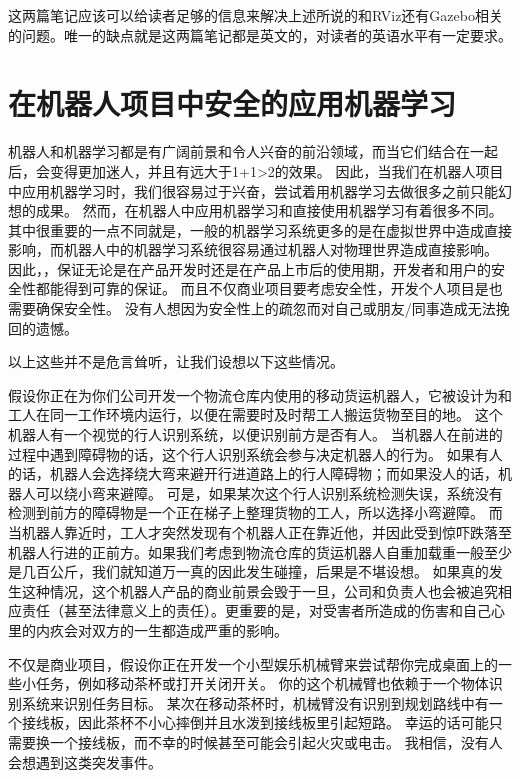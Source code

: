\documentclass[letterpaper,10pt,english]{sphinxmanual}
\begin{document}
\sphinxAtStartPar
这两篇笔记应该可以给读者足够的信息来解决上述所说的和RViz还有Gazebo相关的问题。唯一的缺点就是这两篇笔记都是英文的，对读者的英语水平有一定要求。


\section{在机器人项目中安全的应用机器学习}
\label{\detokenize{chapter_rl_sys/robot_safety:id1}}\label{\detokenize{chapter_rl_sys/robot_safety::doc}}
\sphinxAtStartPar
机器人和机器学习都是有广阔前景和令人兴奋的前沿领域，而当它们结合在一起后，会变得更加迷人，并且有远大于1+1>2的效果。
因此，当我们在机器人项目中应用机器学习时，我们很容易过于兴奋，尝试着用机器学习去做很多之前只能幻想的成果。
然而，在机器人中应用机器学习和直接使用机器学习有着很多不同。
其中很重要的一点不同就是，一般的机器学习系统更多的是在虚拟世界中造成直接影响，而机器人中的机器学习系统很容易通过机器人对物理世界造成直接影响。
因此，，保证无论是在产品开发时还是在产品上市后的使用期，开发者和用户的安全性都能得到可靠的保证。
而且不仅商业项目要考虑安全性，开发个人项目是也需要确保安全性。
没有人想因为安全性上的疏忽而对自己或朋友/同事造成无法挽回的遗憾。

\sphinxAtStartPar
以上这些并不是危言耸听，让我们设想以下这些情况。

\sphinxAtStartPar
假设你正在为你们公司开发一个物流仓库内使用的移动货运机器人，它被设计为和工人在同一工作环境内运行，以便在需要时及时帮工人搬运货物至目的地。
这个机器人有一个视觉的行人识别系统，以便识别前方是否有人。
当机器人在前进的过程中遇到障碍物的话，这个行人识别系统会参与决定机器人的行为。
如果有人的话，机器人会选择绕大弯来避开行进道路上的行人障碍物；而如果没人的话，机器人可以绕小弯来避障。
可是，如果某次这个行人识别系统检测失误，系统没有检测到前方的障碍物是一个正在梯子上整理货物的工人，所以选择小弯避障。
而当机器人靠近时，工人才突然发现有个机器人正在靠近他，并因此受到惊吓跌落至机器人行进的正前方。如果我们考虑到物流仓库的货运机器人自重加载重一般至少是几百公斤，我们就知道万一真的因此发生碰撞，后果是不堪设想。
如果真的发生这种情况，这个机器人产品的商业前景会毁于一旦，公司和负责人也会被追究相应责任（甚至法律意义上的责任）。更重要的是，对受害者所造成的伤害和自己心里的内疚会对双方的一生都造成严重的影响。

\sphinxAtStartPar
不仅是商业项目，假设你正在开发一个小型娱乐机械臂来尝试帮你完成桌面上的一些小任务，例如移动茶杯或打开关闭开关。
你的这个机械臂也依赖于一个物体识别系统来识别任务目标。
某次在移动茶杯时，机械臂没有识别到规划路线中有一个接线板，因此茶杯不小心摔倒并且水泼到接线板里引起短路。
幸运的话可能只需要换一个接线板，而不幸的时候甚至可能会引起火灾或电击。
我相信，没有人会想遇到这类突发事件。
\end{document}
